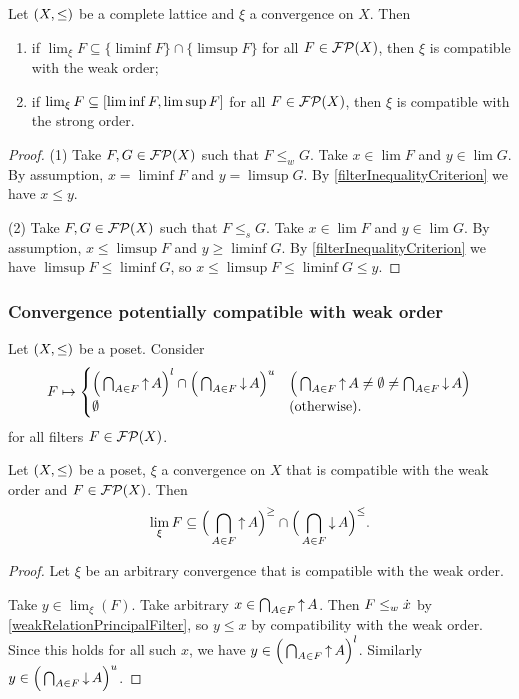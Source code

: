 \begin{lemma} \label{completePosetConvergenceCompatibleWithWeakOrder}
Let $\sSet{X,\leq}$ be a complete lattice and $\xi$ a convergence on $X$. Then
\begin{enumerate}
\item if $\lim_\xi F\subseteq \{\liminf F\}\cap\{\limsup F\}$ for all $F\in\operatorname{\mathcal{FP}}(X)$, then $\xi$ is compatible with the weak order;
\item if $\lim_\xi F\subseteq \interval{\liminf F, \limsup F}$ for all $F\in\operatorname{\mathcal{FP}}(X)$, then $\xi$ is compatible with the strong order.
\end{enumerate}
\end{lemma}
\begin{proof}
(1) Take $F,G\in \operatorname{\mathcal{FP}}(X)$ such that $F\leq_w G$. Take $x\in \lim F$ and $y\in \lim G$. By assumption, $x = \liminf F$ and $y = \limsup G$. By \ref{filterInequalityCriterion} we have $x\leq y$.

(2) Take $F,G\in \operatorname{\mathcal{FP}}(X)$ such that $F\leq_s G$. Take $x\in \lim F$ and $y\in \lim G$. By assumption, $x \leq \limsup F$ and $y \geq \liminf G$. By \ref{filterInequalityCriterion} we have $\limsup F\leq \liminf G$, so $x\leq \limsup F\leq \liminf G \leq y$.
\end{proof}


\subsubsection{Convergence potentially compatible with weak order}
\begin{definition}
Let $\sSet{X,\leq}$ be a poset. Consider
\[ F \mapsto \begin{cases}
\Big(\bigcap_{A\in F}\operatorname{\uparrow} A\Big)^l \cap \Big(\bigcap_{A\in F}\operatorname{\downarrow} A\Big)^u & \Big(\bigcap_{A\in F}\operatorname{\uparrow} A \neq \emptyset \neq \bigcap_{A\in F}\operatorname{\downarrow} A\Big) \\
\emptyset & (\text{otherwise}).
\end{cases} \]
for all filters $F\in \operatorname{\mathcal{FP}}(X)$.
\end{definition}

\begin{proposition} \label{necessityWeakOrderConvergence}
Let $\sSet{X,\leq}$ be a poset, $\xi$ a convergence on $X$ that is compatible with the weak order and $F\in \operatorname{\mathcal{FP}}(X)$. Then
\[ \lim_\xi F \subseteq \Big(\bigcap_{A\in F}\operatorname{\uparrow} A\Big)^\geq \cap \Big(\bigcap_{A\in F}\operatorname{\downarrow} A\Big)^\leq. \]
\end{proposition}
\begin{proof}
Let $\xi$ be an arbitrary convergence that is compatible with the weak order.

Take $y\in \lim_\xi(F)$. Take arbitrary $x\in \bigcap_{A\in F}\operatorname{\uparrow} A$. Then $F \leq_w \dot{x}$ by \ref{weakRelationPrincipalFilter}, so $y\leq x$ by compatibility with the weak order. Since this holds for all such $x$, we have $y\in \Big(\bigcap_{A\in F}\operatorname{\uparrow} A\Big)^l$. Similarly $y\in \Big(\bigcap_{A\in F}\operatorname{\downarrow} A\Big)^u$.
\end{proof}


